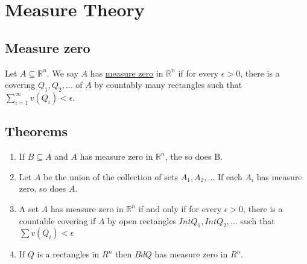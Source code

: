 \section{Measure Theory}

\subsection{Measure zero}
	\label{measure_zero}
	Let $A\subseteq \mathbb{R}^n$. We say $A$ has \underline{measure zero}
	in $\mathbb{R}^n$ if for every $\epsilon>0$, there is a covering $Q_1, Q_2, \dots$ of $A$
	by countably many rectangles such that
	$\sum_{i=1}^\infty v(Q_i)<\epsilon$.



\subsection{Theorems}
\begin{enumerate}
  \item If $B \subseteq A$ and $A$ has measure zero in $\mathbb{R}^n$, the so does B.
  \item Let $A$ be the union of the collection of sets
        $A_1, A_2, \ldots$ If each $A_i$ has measure zero, so does $A$.
  \item A set $A$ has measure zero in $\mathbb{R}^n$ if and only if for every $\epsilon > 0$,
  there is a countable covering if $A$ by open rectangles $Int Q_1, Int Q_2, \ldots$ such that
  $\sum v(Q_i)<\epsilon$
  \item If $Q$ is a rectangles in $R^n$ then $Bd Q$ has measure zero in $R^n$.
\end{enumerate}